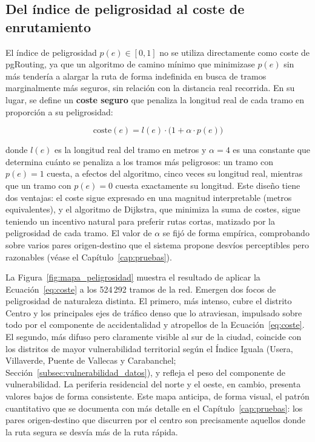 \subsection{Del índice de peligrosidad al coste de enrutamiento}
\label{subsec:coste_enrutamiento}

El índice de peligrosidad $p(e) \in [0, 1]$ no se utiliza directamente como coste de pgRouting, ya que un algoritmo de camino mínimo que minimizase $p(e)$ sin más tendería a alargar la ruta de forma indefinida en busca de tramos marginalmente más seguros, sin relación con la distancia real recorrida. En su lugar, se define un \textbf{coste seguro} que penaliza la longitud real de cada tramo en proporción a su peligrosidad:

\begin{equation}
    \text{coste}(e) = l(e) \cdot \bigl(1 + \alpha \cdot p(e)\bigr)
    \label{eq:coste_seguro}
\end{equation}

donde $l(e)$ es la longitud real del tramo en metros y $\alpha = 4$ es una constante que determina cuánto se penaliza a los tramos más peligrosos: un tramo con $p(e) = 1$ cuesta, a efectos del algoritmo, cinco veces su longitud real, mientras que un tramo con $p(e) = 0$ cuesta exactamente su longitud. Este diseño tiene dos ventajas: el coste sigue expresado en una magnitud interpretable (metros equivalentes), y el algoritmo de Dijkstra, que minimiza la suma de costes, sigue teniendo un incentivo natural para preferir rutas cortas, matizado por la peligrosidad de cada tramo. El valor de $\alpha$ se fijó de forma empírica, comprobando sobre varios pares origen-destino que el sistema propone desvíos perceptibles pero razonables (véase el Capítulo~\ref{cap:pruebas}).

La Figura~\ref{fig:mapa_peligrosidad} muestra el resultado de aplicar la Ecuación~\ref{eq:coste} a los 524\,292 tramos de la red. Emergen dos focos de peligrosidad de naturaleza distinta. El primero, más intenso, cubre el distrito Centro y los principales ejes de tráfico denso que lo atraviesan, impulsado sobre todo por el componente de accidentalidad y atropellos de la Ecuación~\ref{eq:coste}. El segundo, más difuso pero claramente visible al sur de la ciudad, coincide con los distritos de mayor vulnerabilidad territorial según el Índice Iguala (Usera, Villaverde, Puente de Vallecas y Carabanchel; Sección~\ref{subsec:vulnerabilidad_datos}), y refleja el peso del componente de vulnerabilidad. La periferia residencial del norte y el oeste, en cambio, presenta valores bajos de forma consistente. Este mapa anticipa, de forma visual, el patrón cuantitativo que se documenta con más detalle en el Capítulo~\ref{cap:pruebas}: los pares origen-destino que discurren por el centro son precisamente aquellos donde la ruta segura se desvía más de la ruta rápida.


